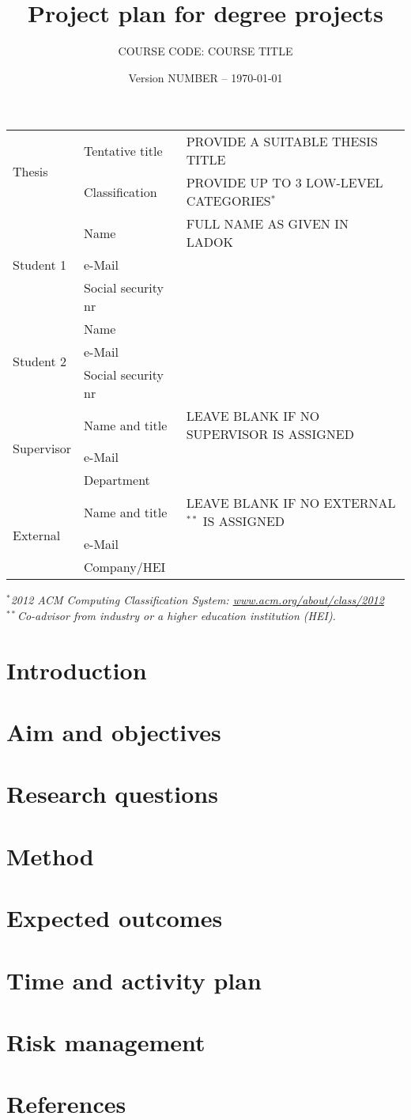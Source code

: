 \documentclass[12pt,a4paper,twoside]{article}
\title{Project plan for degree projects}
\author{COURSE CODE: COURSE TITLE}
\date{Version NUMBER -- \today} %
\begin{document}
%
\maketitle
%
\noindent
\begin{tabular}{|l|l|p{10cm}|}
\hline
\multirow{2}{*}{Thesis} & Tentative title & PROVIDE A SUITABLE THESIS TITLE \\\cline{2-3}
 & Classification & PROVIDE UP TO 3 LOW-LEVEL CATEGORIES$^*$ \\\hline
\multirow{3}{*}{Student 1} & Name                  & FULL NAME AS GIVEN IN LADOK  \\\cline{2-3}
 & e-Mail                &   \\\cline{2-3}
 & Social security nr    &   \\\hline 
\multirow{3}{*}{Student 2} & Name                  &   \\\cline{2-3}
 & e-Mail                &   \\\cline{2-3} 
 & Social security nr    &   \\\hline   
\multirow{3}{*}{Supervisor} & Name and title       & LEAVE BLANK IF NO SUPERVISOR IS ASSIGNED  \\\cline{2-3}
 & e-Mail                &   \\\cline{2-3}
 & Department    &   \\\hline
\multirow{3}{*}{External} & Name and title       & LEAVE BLANK IF NO EXTERNAL$^{**}$ IS ASSIGNED  \\\cline{2-3}
 & e-Mail                &   \\\cline{2-3}
 & Company/HEI    &   \\\hline
\end{tabular}
$^*$\textit{2012 ACM Computing Classification System: \url{www.acm.org/about/class/2012}}\\
\noindent $^{**}$\textit{Co-advisor from industry or a higher education institution (HEI).}
%
\section{Introduction}
%
\section{Aim and objectives}
%
\section{Research questions}
%
\section{Method}
%
\section{Expected outcomes}
%
\section{Time and activity plan}
%
\section{Risk management}
%
\section*{References}
%
\end{document}

